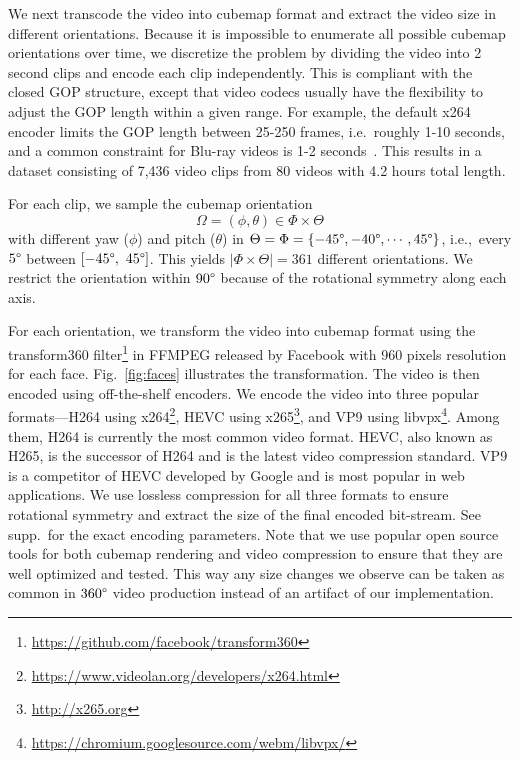 \documentclass[journal,transmag]{IEEEtran}
\begin{document}
We next transcode the video into cubemap format and extract the video size in different orientations.
Because it is impossible to enumerate all possible cubemap orientations over time,
we discretize the problem by dividing the video into 2 second clips and encode each clip independently.
This is compliant with the closed GOP structure,
except that video codecs usually have the flexibility to adjust the GOP length within a given range.
For example, the default x264 encoder limits the GOP length between 25-250 frames,
i.e.~roughly 1-10 seconds,
and a common constraint for Blu-ray videos is 1-2 seconds~\cite{bluray}.
This results in a dataset consisting of 7,436 video clips from 80 videos with 4.2 hours total length.

For each clip, we sample the cubemap orientation
\begin{equation}
    \Omega = (\phi, \theta) \in \Phi \times \Theta
\end{equation}
with different yaw ($\phi$) and pitch ($\theta$) in
 $\Theta = \Phi = \{-45\degree, -40\degree, \cdots, 45\degree\}$,
i.e.,~every $5\degree$ between $[-45\degree,~45\degree]$.
This yields $|\Phi \times \Theta| = 361$ different orientations.
We restrict the orientation within $90\degree$ because of the rotational symmetry along each axis.

For each orientation,
we transform the video into cubemap format using the transform360 filter\footnote{\url{https://github.com/facebook/transform360}} in FFMPEG released by Facebook with 960 pixels resolution for each face.
Fig.~\ref{fig:faces} illustrates the transformation.
The video is then encoded using off-the-shelf encoders.
We encode the video into three popular formats---H264 using x264\footnote{\url{https://www.videolan.org/developers/x264.html}},
HEVC using x265\footnote{\url{http://x265.org}},
and VP9 using libvpx\footnote{\url{https://chromium.googlesource.com/webm/libvpx/}}.
Among them, H264 is currently the most common video format.
HEVC, also known as H265, is the successor of H264 and is the latest video compression standard.
VP9 is a competitor of HEVC developed by Google and is most popular in web applications.
We use lossless compression for all three formats to ensure rotational symmetry and extract the size of the final encoded bit-stream.
See supp.~for the exact encoding parameters.
Note that we use popular open source tools for both cubemap rendering and video compression to ensure that they are well optimized and tested.  This way any size changes we observe can be taken as common in $360\degree$ video production instead of an artifact of our implementation.
\end{document}
